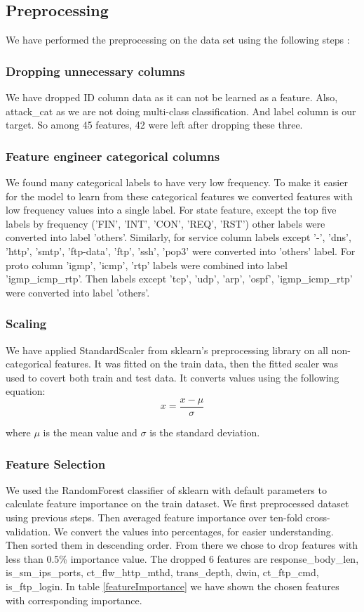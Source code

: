 \documentclass[14pt, conference]{IEEEtran}
\begin{document}
\subsection{Preprocessing \label{preprocessing}}
We have performed the preprocessing on the data set using the following steps :

\subsubsection{Dropping unnecessary columns}
We have dropped ID column data as it can not be learned as a feature. Also, attack\_cat as we are not doing multi-class
classification. And label column is our target. So among 45 features, 42 were left after dropping these three.

\subsubsection{Feature engineer categorical columns}
We found many categorical labels to have very low frequency. To make it easier for the model to learn from these
categorical features we converted features with low frequency values into a single label. For state feature, except
the top five labels by frequency ('FIN', 'INT', 'CON', 'REQ', 'RST') other labels were converted into label 'others'.
Similarly, for service column labels except '-', 'dns', 'http', 'smtp', 'ftp-data', 'ftp', 'ssh', 'pop3' were converted
into 'others' label. For proto column 'igmp', 'icmp', 'rtp' labels were combined into label 'igmp\_icmp\_rtp'.
Then labels except 'tcp', 'udp', 'arp', 'ospf', 'igmp\_icmp\_rtp' were converted into label 'others'.


\subsubsection{Scaling}
We have applied StandardScaler from sklearn's preprocessing library on all non-categorical features. It was
fitted on the train data, then the fitted scaler was used to covert both train and test data. It converts values
using the following equation:
\begin{equation}
    x = \frac{x-\mu}{\sigma}
\end{equation}

where $\mu$ is the mean value and $\sigma$ is the standard deviation.

\subsubsection{Feature Selection}
We used the RandomForest classifier of sklearn with default parameters to calculate feature importance on the
train dataset. We first preprocessed dataset using previous steps. Then averaged feature importance over ten-fold
cross-validation. We convert the values into percentages, for easier understanding. Then sorted them in descending order.
From there we chose to drop features with less than 0.5\% importance value. The dropped 6 features are response\_body\_len,
is\_sm\_ips\_ports, ct\_flw\_http\_mthd, trans\_depth, dwin, ct\_ftp\_cmd, is\_ftp\_login. In table \ref{featureImportance}
we have shown the chosen features with corresponding importance.
\end{document}
